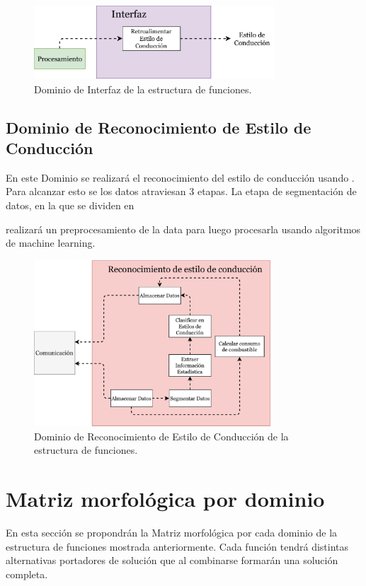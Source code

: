 \begin{figure}[htbp!]
\centering
\includegraphics[width=0.8\textwidth]{int.pdf}
\caption{Dominio de Interfaz de la estructura de funciones.}
\label{fig:int}
\end{figure}

\subsection{Dominio de Reconocimiento de Estilo de Conducción}
En este Dominio se realizará el reconocimiento del estilo de conducción usando . Para alcanzar esto se los datos atraviesan 3 etapas. La etapa de segmentación de datos, en la que se dividen en

realizará un preprocesamiento de la data para luego procesarla usando algoritmos de machine learning.

\begin{figure}[htbp!]
\centering
\includegraphics[width=0.8\textwidth]{rec.pdf}
\caption{Dominio de Reconocimiento de Estilo de Conducción de la estructura de funciones.}
\label{fig:3.7}
\end{figure}


\section{Matriz morfológica por dominio}
En esta sección se propondrán la Matriz morfológica por cada dominio de la estructura de funciones mostrada anteriormente. Cada función tendrá distintas alternativas portadores de solución que al combinarse formarán una solución completa.

